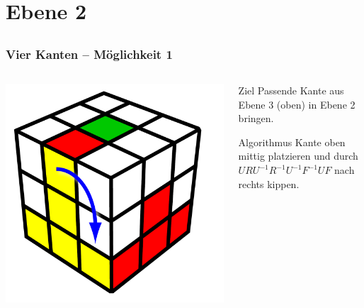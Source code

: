 

\section{Ebene 2} %
\label{sec:ebene_2}

\subsection*{}

\begin{frame}
	\frametitle{Vier Kanten -- Möglichkeit 1}
	
	\begin{columns}[c]
		\begin{column}[C]{.5\textwidth}
			\center
			\includegraphics[scale=0.3]{img/layer2edge1}
		\end{column}
		\begin{column}[C]{.5\textwidth}
			\begin{block}{Ziel}
				Passende Kante aus Ebene 3 (oben) in Ebene 2 bringen.
			\end{block}
			\begin{exampleblock}{Algorithmus}
				Kante oben mittig platzieren und durch $URU^{-1}R^{-1}U^{-1}F^{-1}UF$ nach rechts kippen.
			\end{exampleblock}
		\end{column}
	\end{columns}
	
\end{frame}

